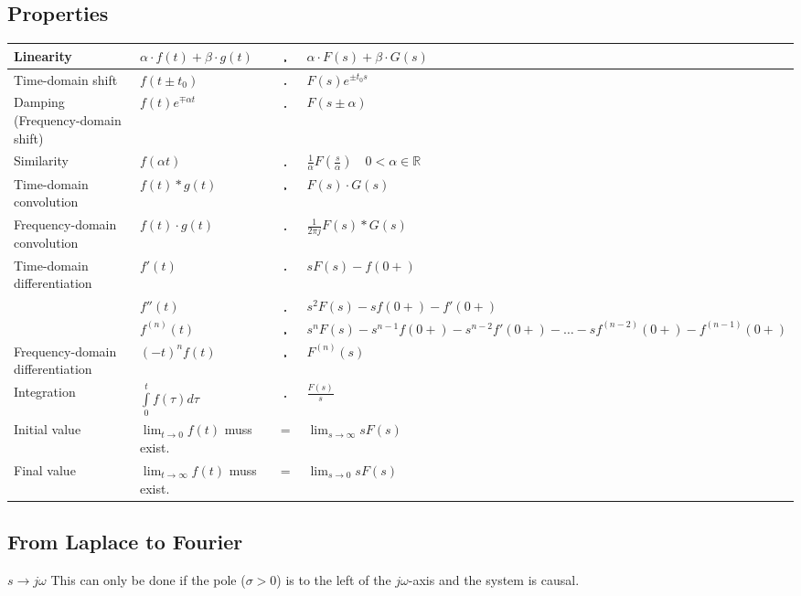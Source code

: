  	\subsection{Properties}
 	    \label{sec:Laplace Umwandulungen}
  		\renewcommand{\arraystretch}{2}
		\begin{tabular}{|l|l c p{5.5cm}|}
        	\hline
        	Linearity &
 			$\alpha\cdot f(t) + \beta\cdot g(t)$ & $\FT$ & $\alpha\cdot F(s) +
 			\beta\cdot G(s)$ \\
 			\hline
 			Time-domain shift &
 			$f(t\pm t_0) $ & $\FT$ & $ F(s)e^{\pm t_0 s}$ \\
 			\hline
 			Damping (Frequency-domain shift) &
 			$f(t)e^{\mp\alpha t}$ & $\FT$ & $F(s\pm\alpha)$ \\
 			\hline
 			Similarity&
 			$f(\alpha t)$ & $\FT$ & $\frac{1}{\alpha}F \left (\frac{s}{\alpha} \right )
 			\quad 0 <\alpha \in\mathbb{R}$ \\
 			\hline
 			Time-domain convolution &
 			$f(t) \ast g(t)$ & $\FT$ &
 			$F(s) \cdot G(s)$\\
 			\hline
 			Frequency-domain convolution &
 			$f(t) \cdot g(t)$ & $\FT$ & $\frac{1}{2 \pi j} F(s) \ast G(s)$ \\
 			\hline
 			Time-domain differentiation &
 			$f'(t)$ & $\FT$ & $sF(s) - f(0+)$ \\
 			&
 			$f''(t)$ & $\FT$ & $s^2 F(s) - sf(0+) - f'(0+)$\\
 			&
 			$f^{(n)}(t)$ & $\FT$ & $s^nF(s) - s^{n-1}f(0+) - s^{n-2} f'(0+) - \ldots
 			-s f^{(n-2)}(0+) - f^{(n-1)}(0+)$ \\
 			\hline
 			Frequency-domain differentiation &
 			$(-t)^n f(t)$ & $\FT$ & $F^{(n)}(s)$ \\
 			\hline
 			Integration &
 			$\int\limits_0^t f(\tau)d\tau$ & $\FT$ & $\frac{F(s)}{s}$ \\
 			\hline
 			Initial value &
 			$\lim_{t\rightarrow 0} f(t)$ muss exist. & $=$ & $\lim_{s\rightarrow
 			\infty} sF(s)$ \\
 			\hline
 			Final value &
 			$\lim_{t\rightarrow \infty} f(t)$ muss exist. & $=$ &
 			$\lim_{s\rightarrow 0} sF(s)$ \\
 			\hline
       	\end{tabular}
		\renewcommand{\arraystretch}{1}


		\subsection{From Laplace to Fourier}
			$s \rightarrow j\omega$ \hspace{0.5cm}
			This can only be done if the pole ($\sigma > 0$) is to the left of
			the $j\omega$-axis and the system is causal.


